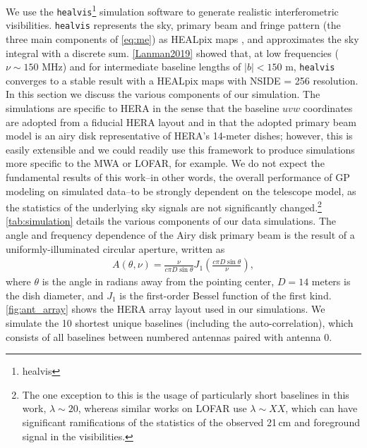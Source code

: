 \documentclass[a4paper,fleqn,usenatbib]{mnras}
\begin{document}
We use the \texttt{healvis}\footnote{healvis} simulation software \citep{Lanman2019} to generate realistic interferometric visibilities.
\texttt{healvis} represents the sky, primary beam and fringe pattern (the three main components of \autoref{eq:me}) as HEALpix maps \citep{Gorski}, and approximates the sky integral with a discrete sum.
\autoref{Lanman2019} showed that, at low frequencies ($\nu\sim150$ MHz) and for intermediate baseline lengths of $|b| < 150$ m, \texttt{healvis} converges to a stable result with a HEALpix maps with NSIDE = 256 resolution.
In this section we discuss the various components of our simulation.
The simulations are specific to HERA in the sense that the baseline $uvw$ coordinates are adopted from a fiducial HERA layout and in that the adopted primary beam model is an airy disk representative of HERA's 14-meter dishes; however, this is easily extensible and we could readily use this framework to produce simulations more specific to the MWA or LOFAR, for example.
We do not expect the fundamental results of this work--in other words, the overall performance of GP modeling on simulated data--to be strongly dependent on the telescope model, as the statistics of the underlying sky signals are not significantly changed.\footnote{The one exception to this is the usage of particularly short baselines in this work, $\lambda \sim 20$, whereas similar works on LOFAR use $\lambda\sim XX$, which can have significant ramifications of the statistics of the observed 21\,cm and foreground signal in the visibilities.}
\autoref{tab:simulation} details the various components of our data simulations.
The angle and frequency dependence of the Airy disk primary beam is the result of a uniformly-illuminated circular aperture, written as
\begin{align}
A(\theta, \nu) = \frac{\nu}{c\pi D\sin\theta}J_1\left(\frac{c\pi D\sin\theta}{\nu}\right),
\end{align}
where $\theta$ is the angle in radians away from the pointing center, $D=14$ meters is the dish diameter, and $J_1$ is the first-order Bessel function of the first kind.
\autoref{fig:ant_array} shows the HERA array layout used in our simulations.
We simulate the 10 shortest unique baselines (including the auto-correlation), which consists of all baselines between numbered antennas paired with antenna 0.
\end{document}
